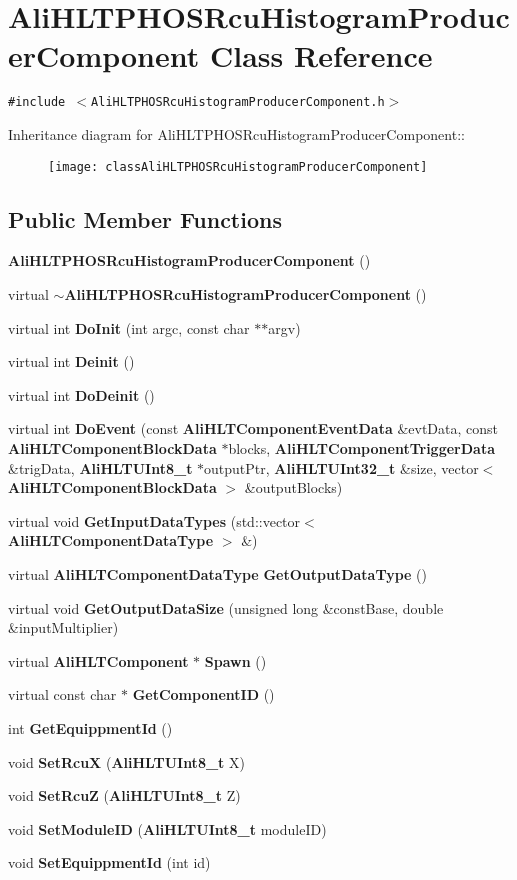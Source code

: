 \section{Ali\-HLTPHOSRcu\-Histogram\-Producer\-Component Class Reference}
\label{classAliHLTPHOSRcuHistogramProducerComponent}
{\tt \#include $<$Ali\-HLTPHOSRcu\-Histogram\-Producer\-Component.h$>$}

Inheritance diagram for Ali\-HLTPHOSRcu\-Histogram\-Producer\-Component::\begin{figure}[H]
\begin{center}
\leavevmode
\texttt{[image: classAliHLTPHOSRcuHistogramProducerComponent]}
\end{center}
\end{figure}
\subsection*{Public Member Functions}
\begin{CompactItemize}
\item 
{\bf Ali\-HLTPHOSRcu\-Histogram\-Producer\-Component} ()
\item 
virtual {\bf $\sim$Ali\-HLTPHOSRcu\-Histogram\-Producer\-Component} ()
\item 
virtual int {\bf Do\-Init} (int argc, const char $\ast$$\ast$argv)
\item 
virtual int {\bf Deinit} ()
\item 
virtual int {\bf Do\-Deinit} ()
\item 
virtual int {\bf Do\-Event} (const {\bf Ali\-HLTComponent\-Event\-Data} \&evt\-Data, const {\bf Ali\-HLTComponent\-Block\-Data} $\ast$blocks, {\bf Ali\-HLTComponent\-Trigger\-Data} \&trig\-Data, {\bf Ali\-HLTUInt8\_\-t} $\ast$output\-Ptr, {\bf Ali\-HLTUInt32\_\-t} \&size, vector$<$ {\bf Ali\-HLTComponent\-Block\-Data} $>$ \&output\-Blocks)
\item 
virtual void {\bf Get\-Input\-Data\-Types} (std::vector$<$ {\bf Ali\-HLTComponent\-Data\-Type} $>$ \&)
\item 
virtual {\bf Ali\-HLTComponent\-Data\-Type} {\bf Get\-Output\-Data\-Type} ()
\item 
virtual void {\bf Get\-Output\-Data\-Size} (unsigned long \&const\-Base, double \&input\-Multiplier)
\item 
virtual {\bf Ali\-HLTComponent} $\ast$ {\bf Spawn} ()
\item 
virtual const char $\ast$ {\bf Get\-Component\-ID} ()
\item 
int {\bf Get\-Equippment\-Id} ()
\item 
void {\bf Set\-Rcu\-X} ({\bf Ali\-HLTUInt8\_\-t} X)
\item 
void {\bf Set\-Rcu\-Z} ({\bf Ali\-HLTUInt8\_\-t} Z)
\item 
void {\bf Set\-Module\-ID} ({\bf Ali\-HLTUInt8\_\-t} module\-ID)
\item 
void {\bf Set\-Equippment\-Id} (int id)
\end{CompactItemize}
